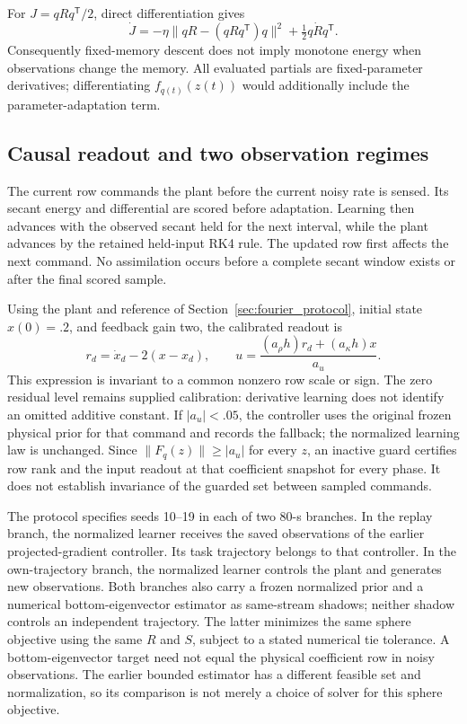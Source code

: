 \documentclass[journal]{IEEEtran}
\begin{document}
For $J=qRq^{\mathsf T}/2$, direct differentiation gives
\begin{equation}
 \dot J=-\eta\|qR-(qRq^{\mathsf T})q\|^2
               +\tfrac12q\dot Rq^{\mathsf T}.
 \label{eq:nf_moving_energy}
\end{equation}
Consequently fixed-memory descent does not imply monotone energy when
observations change the memory. All evaluated partials are fixed-parameter
derivatives; differentiating $f_{q(t)}(z(t))$ would additionally include
the parameter-adaptation term.

\subsection{Causal readout and two observation regimes}
The current row commands the plant before the current noisy rate is sensed.
Its secant energy and differential are scored before adaptation. Learning
then advances with the observed secant held for the next interval, while
the plant advances by the retained held-input RK4 rule. The updated row
first affects the next command. No assimilation occurs before a complete
secant window exists or after the final scored sample.

Using the plant and reference of Section~\ref{sec:fourier_protocol}, initial
state $x(0)=.2$, and feedback gain two, the calibrated readout is
\begin{equation}
 r_d=\dot x_d-2(x-x_d),\qquad
 u=\frac{(a_\rho h)r_d+(a_\kappa h)x}{a_u}.
 \label{eq:nf_control}
\end{equation}
This expression is invariant to a common nonzero row scale or sign.
The zero residual level remains supplied calibration: derivative learning
does not identify an omitted additive constant. If $|a_u|<.05$, the
controller uses the original frozen physical prior for that command and
records the fallback; the normalized learning law is unchanged. Since
$\|F_q(z)\|\ge |a_u|$ for every $z$, an inactive guard certifies row rank
and the input readout at that coefficient snapshot for every phase.
It does not establish invariance of the guarded set between sampled commands.

The protocol specifies seeds 10--19 in each of two 80-s branches. In the
replay branch, the normalized learner receives the saved observations of
the earlier projected-gradient controller. Its task trajectory belongs to
that controller. In the own-trajectory branch, the normalized learner
controls the plant and generates new observations. Both branches also
carry a frozen normalized prior and a numerical bottom-eigenvector
estimator as same-stream shadows; neither shadow controls an independent
trajectory. The latter minimizes the same sphere objective using the same
$R$ and $S$, subject to a stated numerical tie tolerance. A bottom-eigenvector
target need not equal the physical coefficient row in noisy observations.
The earlier bounded estimator has a different feasible set and normalization,
so its comparison is not merely a choice of solver for this sphere objective.
\end{document}
